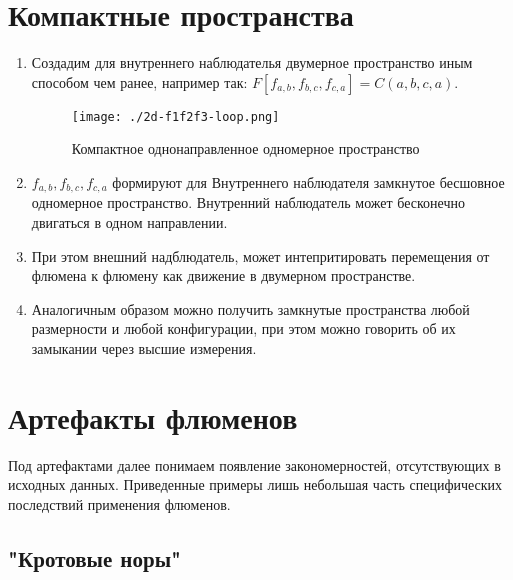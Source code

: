 \documentclass[final]{article}
\begin{document}
    \section{Компактные пространства}
        \begin{enumerate}

            \item Создадим для внутреннего наблюдателья двумерное пространство иным 
            способом чем ранее, например так: \( F[f_{a,b},f_{b,c},f_{c,a}] = C(a,b,c,a) \).

            \begin{figure}[H]
                \centering
                \texttt{[image: ./2d-f1f2f3-loop.png]}
                \caption{Компактное однонаправленное одномерное пространство}
                \label{fig:image}
            \end{figure}

            \item \(f_{a,b},f_{b,c},f_{c,a}\) формируют для Внутреннего наблюдателя 
            замкнутое бесшовное одномерное пространство. Внутренний наблюдатель может 
            бесконечно двигаться в одном направлении.

            \item При этом внешний надблюдатель, может интепритировать перемещения 
            от флюмена к флюмену как движение в двумерном пространстве.

            \item Аналогичным образом можно получить замкнутые пространства любой 
            размерности и любой конфигурации, при этом можно говорить об их замыкании 
            через высшие измерения.

        \end{enumerate}



    \section{Артефакты флюменов}
        
        Под артефактами далее понимаем появление закономерностей, отсутствующих 
        в исходных данных. Приведенные примеры лишь небольшая часть 
        специфических последствий применения флюменов.


        \subsection{"Кротовые норы"}
\end{document}
